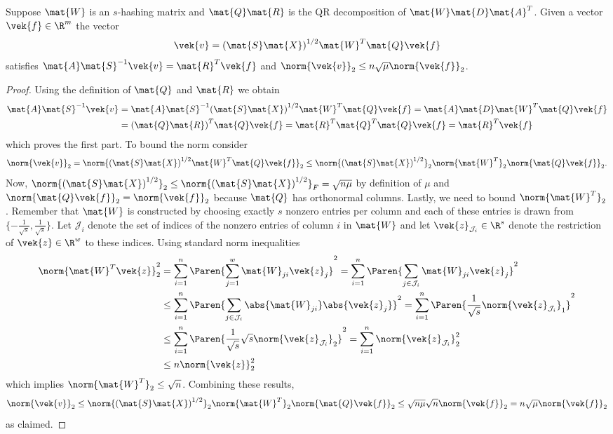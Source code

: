 \begin{lemma}\label{thm:perturbation-vector}
Suppose \(\mat{W}\) is an \(s\)-hashing matrix and \(\mat{Q}\mat{R}\) is the QR decomposition of \(\mat{W}\mat{D}\mat{A}^T\).
Given a vector \(\vek{f} \in \R^m\) the vector
\[ \vek{v} = {(\mat{S}\mat{X})}^{1/2} \mat{W}^T \mat{Q} \vek{f} \]
satisfies \( \mat{A}\mat{S}^{-1}\vek{v} = \mat{R}^T \vek{f} \) and \(\norm{\vek{v}}_2 \leq n \sqrt{\mu} \norm{\vek{f}}_2\).
\end{lemma}
\begin{proof}
Using the definition of \(\mat{Q}\) and \(\mat{R}\) we obtain
\begin{align*}
  \mat{A} \mat{S}^{-1} \vek{v}
  &= \mat{A} \mat{S}^{-1} {(\mat{S}\mat{X})}^{1/2} \mat{W}^T \mat{Q} \vek{f}
   = \mat{A} \mat{D} \mat{W}^T \mat{Q} \vek{f} \\
  &= {(\mat{Q} \mat{R})}^T \mat{Q} \vek{f}
   = \mat{R}^T \mat{Q}^T \mat{Q} \vek{f}
   = \mat{R}^T \vek{f}
\end{align*}
which proves the first part.
To bound the norm consider
\[ 
  \norm{\vek{v}}_2
  = \norm{{(\mat{S}\mat{X})}^{1/2} \mat{W}^T \mat{Q} \vek{f}}_2
  \leq \norm{{(\mat{S}\mat{X})}^{1/2}}_2 \norm{\mat{W}^T}_2 \norm{\mat{Q} \vek{f}}_2.
\]
Now, \(\norm{{(\mat{S}\mat{X})}^{1/2}}_2 \leq \norm{{(\mat{S}\mat{X})}^{1/2}}_F = \sqrt{n \mu}\) by definition of \(\mu\) and \(\norm{\mat{Q}\vek{f}}_2 = \norm{\vek{f}}_2\) because \(\mat{Q}\) has orthonormal columns.
Lastly, we need to bound \(\norm{\mat{W}^T}_2\).
Remember that \(\mat{W}\) is constructed by choosing exactly \(s\) nonzero entries per column and each of these entries is drawn from \(\{-\frac{1}{\sqrt{s}}, \frac{1}{\sqrt{s}}\}\).
Let \(\mathcal{J}_i\) denote the set of indices of the nonzero entries of column \(i\) in \(\mat{W}\) and let \(\vek{z}_{\mathcal{J}_i} \in \R^s\) denote the restriction of \(\vek{z} \in \R^w\) to these indices.
Using standard norm inequalities
\begin{align*}
  \norm{\mat{W}^T \vek{z}}_2^2 &= \sum_{i=1}^{n} \Paren{ \sum_{j=1}^{w} \mat{W}_{ji} \vek{z}_j }^2 = \sum_{i=1}^{n} \Paren{ \sum_{j \in \mathcal{J}_i} \mat{W}_{ji} \vek{z}_j }^2 \\
  &\leq \sum_{i=1}^{n} \Paren{ \sum_{j \in \mathcal{J}_i} \abs{\mat{W}_{ji}} \abs{\vek{z}_j} }^2 = \sum_{i=1}^{n} \Paren{ \frac{1}{\sqrt{s}} \norm{\vek{z}_{\mathcal{J}_i}}_1 }^2 \\
  &\leq \sum_{i=1}^{n} \Paren{ \frac{1}{\sqrt{s}} \sqrt{s} \norm{\vek{z}_{\mathcal{J}_i}}_2 }^2 = \sum_{i=1}^{n} \norm{\vek{z}_{\mathcal{J}_i}}_2^2 \\
  &\leq n \norm{\vek{z}}_2^2
\end{align*}
which implies \(\norm{\mat{W}^T}_2 \leq \sqrt{n}\).
Combining these results,
\[ 
  \norm{\vek{v}}_2
  \leq \norm{{(\mat{S}\mat{X})}^{1/2}}_2 \norm{\mat{W}^T}_2 \norm{\mat{Q} \vek{f}}_2
  \leq \sqrt{n \mu} \sqrt{n} \norm{\vek{f}}_2 = n \sqrt{\mu} \norm{\vek{f}}_2
\]
as claimed.
\end{proof}

